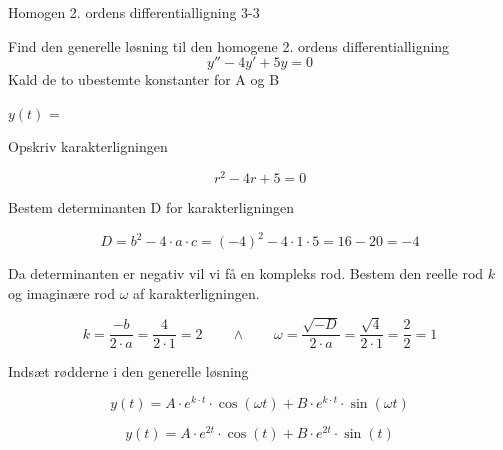 \documentclass{article}
\begin{document}
\begin{exercise}{Homogen 2. ordens differentialligning 3-3}

Find den generelle løsning til den homogene 2. ordens differentialligning
\[
y'' - 4y' + 5y = 0
\]
Kald de to ubestemte konstanter for A og B

$y(t)$ = 


\hint

Opskriv karakterligningen

\hint

\[
r^2 - 4r + 5 = 0
\]


\hint

Bestem determinanten D for karakterligningen


\hint
\[
D = b^2 - 4 \cdot a \cdot c = (-4)^2 - 4 \cdot 1 \cdot 5 = 16 - 20 = -4
\]

\hint
Da determinanten er negativ vil vi få en kompleks rod. Bestem den reelle rod $k$ og imaginære rod $\omega$ af karakterligningen.


\hint

\[
k = \frac{-b}{2 \cdot a} = \frac{4}{2 \cdot 1} = 2 \qquad \wedge \qquad \omega = \frac{\sqrt{-D}}{2 \cdot a} = \frac{\sqrt{4}}{2 \cdot 1} = \frac{2}{2} = 1
\]

\hint

Indsæt rødderne i den generelle løsning

\hint
\[
y(t) = A \cdot e^{k \cdot t} \cdot \cos(\omega t)+ B \cdot e^{k \cdot t} \cdot \sin(\omega t)
\]

\hint

\[
y(t) = A \cdot e^{2 t} \cdot \cos(t)+ B \cdot e^{2 t} \cdot \sin(t)
\]

\end{exercise}
\end{document}
